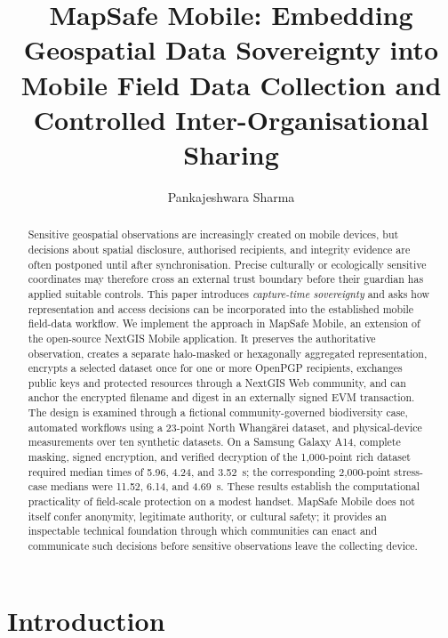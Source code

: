 \documentclass[a4paper,UKenglish,cleveref,autoref,thm-restate]{lipics-v2021}
\title{MapSafe Mobile: Embedding Geospatial Data Sovereignty into Mobile Field Data Collection and Controlled Inter-Organisational Sharing}
\author{Pankajeshwara {Sharma}}%
{Universal College of Learning, Palmerston North, New Zealand}%
{p.sharma@ucol.ac.nz}%
{https://orcid.org/0000-0001-9159-8332}%
{}
\begin{document}
\maketitle

\begin{abstract}
Sensitive geospatial observations are increasingly created on mobile devices, but decisions about spatial disclosure, authorised recipients, and integrity evidence are often postponed until after synchronisation. Precise culturally or ecologically sensitive coordinates may therefore cross an external trust boundary before their guardian has applied suitable controls. This paper introduces \emph{capture-time sovereignty} and asks how representation and access decisions can be incorporated into the established mobile field-data workflow. We implement the approach in MapSafe Mobile, an extension of the open-source NextGIS Mobile application. It preserves the authoritative observation, creates a separate halo-masked or hexagonally aggregated representation, encrypts a selected dataset once for one or more OpenPGP recipients, exchanges public keys and protected resources through a NextGIS Web community, and can anchor the encrypted filename and digest in an externally signed EVM transaction. The design is examined through a fictional community-governed biodiversity case, automated workflows using a 23-point North Whangārei dataset, and physical-device measurements over ten synthetic datasets. On a Samsung Galaxy A14, complete masking, signed encryption, and verified decryption of the 1,000-point rich dataset required median times of 5.96, 4.24, and 3.52~s; the corresponding 2,000-point stress-case medians were 11.52, 6.14, and 4.69~s. These results establish the computational practicality of field-scale protection on a modest handset. MapSafe Mobile does not itself confer anonymity, legitimate authority, or cultural safety; it provides an inspectable technical foundation through which communities can enact and communicate such decisions before sensitive observations leave the collecting device.
\end{abstract}

\section{Introduction}
\label{sec:introduction}
\end{document}
